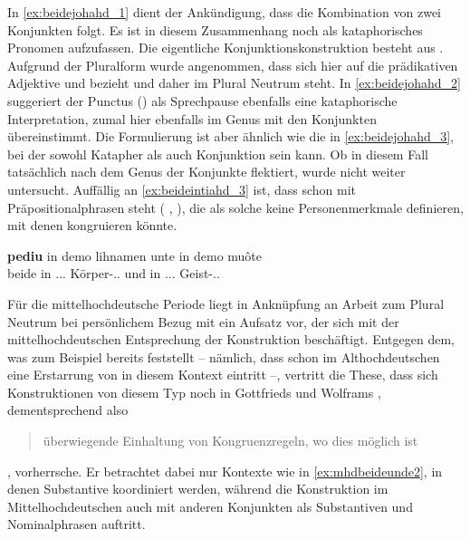 In \cref{ex:beidejohahd_1} dient  der Ankündigung, dass die
Kombination von zwei Konjunkten folgt. Es ist in diesem Zusammenhang noch als
kataphorisches Pronomen aufzufassen. Die eigentliche Konjunktionskonstruktion
besteht aus  
\autocite[vgl.][169]{schuetzeichel2012}. Aufgrund der Pluralform wurde
angenommen, dass  sich hier auf die prädikativen Adjektive
  und 
 bezieht und daher im Plural Neutrum steht. In
\cref{ex:beidejohahd_2} suggeriert der Punctus () als Sprechpause
ebenfalls eine kataphorische Interpretation, zumal  hier ebenfalls
im Genus mit den Konjunkten übereinstimmt. Die Formulierung ist aber ähnlich
wie die in \cref{ex:beidejohahd_3}, bei der  sowohl Katapher als
auch Konjunktion sein kann. Ob  in diesem Fall tatsächlich nach
dem Genus der Konjunkte flektiert, wurde nicht weiter untersucht.
Auffällig an \cref{ex:beideintiahd_3} ist, dass  schon mit
Präpositionalphrasen steht ( ,
 ), die als solche keine Personenmerkmale
definieren, mit denen  kongruieren könnte.

\begin{exe}
\ex \label{ex:beideintiahd_3}
	\gll \textbf{pediu} in demo lihnamen unte in demo muôte \\
		beide in \Def.\Dat.\Sg.\M{} Körper-\Dat.\Sg.\M{} und in
			\Def.\Dat.\Sg.\M{} Geist-\Dat.\Sg.\M{} \\
	\begin{taggedline}{\parencite[APB\_PredigtsammlungB, 1732--1739]{ddd}}
	\trans {}
	\end{taggedline}
\end{exe}

Für die mittelhochdeutsche Periode liegt in Anknüpfung an
 Arbeit zum Plural Neutrum bei persönlichem Bezug mit
\citet{askedal1974} ein Aufsatz vor, der sich mit der mittelhochdeutschen
Entsprechung der Konstruktion  beschäftigt. Entgegen
dem, was zum Beispiel bereits \citet[433--434]{behaghel1923} feststellt --
nämlich, dass schon im Althochdeutschen eine Erstarrung von  in
diesem Kontext eintritt --, vertritt \citeauthor{askedal1974} die These, dass
sich Konstruktionen von diesem Typ noch in Gottfrieds
\nocite{maroldschroeder1969} und Wolframs
\nocite{lachmannhartl1952} ,
dementsprechend also \blockcquote[37]{askedal1974}{überwiegende Einhaltung von
Kongruenzregeln, wo dies möglich ist}, vorherrsche. Er betrachtet dabei nur
Kontexte wie in \cref{ex:mhdbeideunde2}, in denen Substantive koordiniert
werden, während die Konstruktion im Mittelhochdeutschen auch mit anderen
Konjunkten als Substantiven und Nominalphrasen auftritt.

